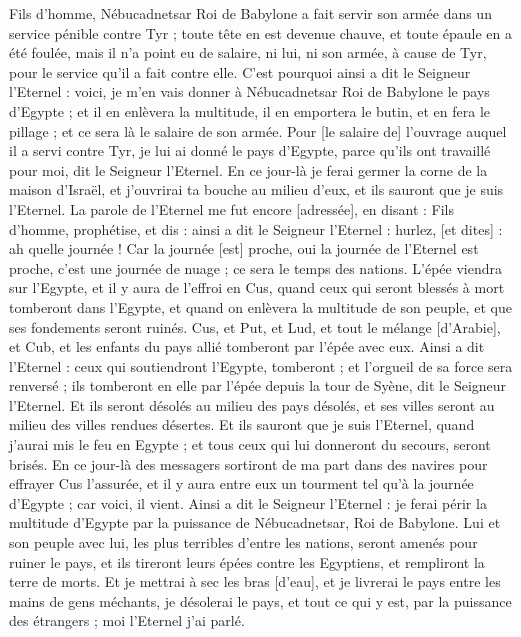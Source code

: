 \begin{multicols}{2}
Fils d'homme, Nébucadnetsar Roi de Babylone a fait servir son armée dans un service pénible contre Tyr ; toute tête en est devenue chauve, et toute épaule en a été foulée, mais il n'a point eu de salaire, ni lui, ni son armée, à cause de Tyr, pour le service qu'il a fait contre elle.
C'est pourquoi ainsi a dit le Seigneur l'Eternel : voici, je m'en vais donner à Nébucadnetsar Roi de Babylone le pays d'Egypte ; et il en enlèvera la multitude, il en emportera le butin, et en fera le pillage ; et ce sera là le salaire de son armée.
Pour [le salaire de] l'ouvrage auquel il a servi contre Tyr, je lui ai donné le pays d'Egypte, parce qu'ils ont travaillé pour moi, dit le Seigneur l'Eternel.
En ce jour-là je ferai germer la corne de la maison d'Israël, et j'ouvrirai ta bouche au milieu d'eux, et ils sauront que je suis l'Eternel.
\VerseOne{}La parole de l'Eternel me fut encore [adressée], en disant :
Fils d'homme, prophétise, et dis : ainsi a dit le Seigneur l'Eternel : hurlez, [et dites] : ah quelle journée !
Car la journée [est] proche, oui la journée de l'Eternel est proche, c'est une journée de nuage ; ce sera le temps des nations.
L'épée viendra sur l'Egypte, et il y aura de l'effroi en Cus, quand ceux qui seront blessés à mort tomberont dans l'Egypte, et quand on enlèvera la multitude de son peuple, et que ses fondements seront ruinés.
Cus, et Put, et Lud, et tout le mélange [d'Arabie], et Cub, et les enfants du pays allié tomberont par l'épée avec eux.
Ainsi a dit l'Eternel : ceux qui soutiendront l'Egypte, tomberont ; et l'orgueil de sa force sera renversé ; ils tomberont en elle par l'épée depuis la tour de Syène, dit le Seigneur l'Eternel.
Et ils seront désolés au milieu des pays désolés, et ses villes seront au milieu des villes rendues désertes.
Et ils sauront que je suis l'Eternel, quand j'aurai mis le feu en Egypte ; et tous ceux qui lui donneront du secours, seront brisés.
En ce jour-là des messagers sortiront de ma part dans des navires pour effrayer Cus l'assurée, et il y aura entre eux un tourment tel qu'à la journée d'Egypte ; car voici, il vient.
Ainsi a dit le Seigneur l'Eternel : je ferai périr la multitude d'Egypte par la puissance de Nébucadnetsar, Roi de Babylone.
Lui et son peuple avec lui, les plus terribles d'entre les nations, seront amenés pour ruiner le pays, et ils tireront leurs épées contre les Egyptiens, et rempliront la terre de morts.
Et je mettrai à sec les bras [d'eau], et je livrerai le pays entre les mains de gens méchants, je désolerai le pays, et tout ce qui y est, par la puissance des étrangers ; moi l'Eternel j'ai parlé.

\end{multicols}
